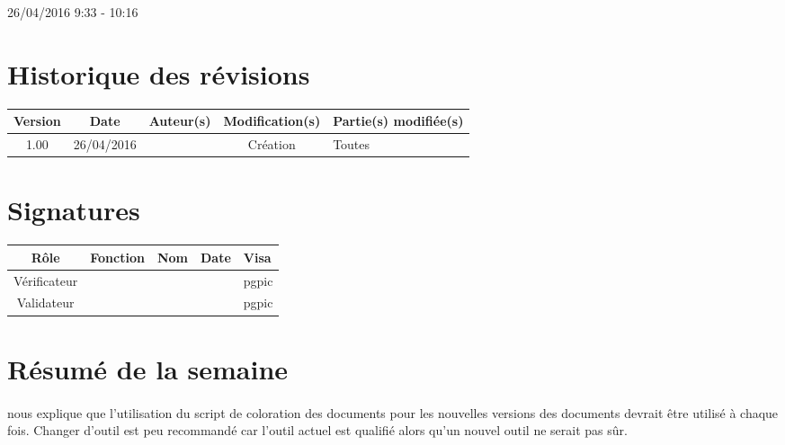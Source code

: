 \documentclass [a4paper] {article}
\begin{document}
\rhead{}

26/04/2016
\hfill   
\hfill 	9:33 - 10:16 				%



\section*{Historique des révisions}
\begin{center}
			\begin{tabular}{| c | c | c | c | p{4cm} |}
				\hline
				\rowcolor{Gray}
				Version & Date & Auteur(s) & Modification(s) & Partie(s) modifiée(s)		 \\
				\hline
				1.00 & 26/04/2016 & \Pierre & Création & Toutes \\
		\hline		
			\end{tabular}
		\end{center}

\section*{Signatures}

		\begin{center}
			\begin{tabular}{| c | c | c | c | p{4cm} |}
				\hline
				\rowcolor{Gray}
				Rôle & Fonction & Nom & Date & Visa		 \\
				\hline
				Vérificateur & \RQA & \Kafui &  & pgpic \\[30pt]
				\hline
				Validateur & \CP & \Sergi &  & pgpic \\[30pt]	
				\hline
			\end{tabular}
		\end{center}


\section{Résumé de la semaine}
\paragraph*{}
\nomTuteurQualite{} nous explique que l'utilisation du script de coloration des documents pour les nouvelles versions des documents devrait être utilisé à chaque fois. Changer d'outil est peu recommandé car l'outil actuel est qualifié alors qu'un nouvel outil ne serait pas sûr.
\end{document}
